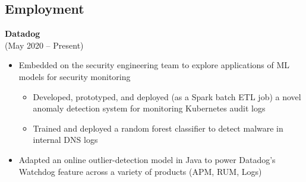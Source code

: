 \documentclass{res}
\begin{document}
 
\setlength{\parskip}{10pt}
\renewcommand{\labelitemi}{\scriptsize$\bullet$} 

\address{\hspace{2pt}} %
\address{\href{http://www.maxlivingston.com}{maxlivingston.com}}

\begin{resume}
  \setlength{\sectionskip}{0pt}
  \section{Employment}
  \setlength{\sectionskip}{5pt}
  \vspace{2pt}
    {\bf Datadog} \\ 
     \hspace{3pt} (May 2020 -- Present)
    \vspace{2pt}
  \begin{itemize} \itemsep 2.0pt \parskip 2.0pt %
  \item Embedded on the security engineering team to explore applications of ML models for security monitoring
    \setlength{\parskip}{-2pt} 
    \begin{itemize}
      \setlength{\itemsep}{1.0pt}
    \item Developed, prototyped, and deployed (as a Spark batch ETL job) a novel anomaly detection system for monitoring Kubernetes audit logs
    \item Trained and deployed a random forest classifier to detect malware in internal DNS logs
    \end{itemize}
    \setlength{\parskip}{2.0pt} 
      
  \item Adapted an online outlier-detection model in Java to power Datadog's Watchdog feature across a variety of products (APM, RUM, Logs)

  \end{itemize}
  

\end{resume}
\end{document}
